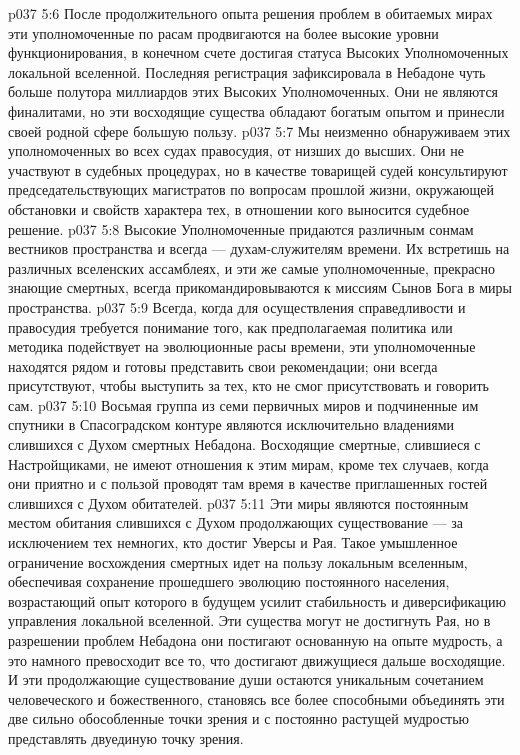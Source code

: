 \vs p037 5:6 После продолжительного опыта решения проблем в обитаемых мирах эти уполномоченные по расам продвигаются на более высокие уровни функционирования, в конечном счете достигая статуса Высоких Уполномоченных локальной вселенной. Последняя регистрация зафиксировала в Небадоне чуть больше полутора миллиардов этих Высоких Уполномоченных. Они не являются финалитами, но эти восходящие существа обладают богатым опытом и принесли своей родной сфере большую пользу.
\vs p037 5:7 Мы неизменно обнаруживаем этих уполномоченных во всех судах правосудия, от низших до высших. Они не участвуют в судебных процедурах, но в качестве товарищей судей консультируют председательствующих магистратов по вопросам прошлой жизни, окружающей обстановки и свойств характера тех, в отношении кого выносится судебное решение.
\vs p037 5:8 Высокие Уполномоченные придаются различным сонмам вестников пространства и всегда --- духам\hyp{}служителям времени. Их встретишь на различных вселенских ассамблеях, и эти же самые уполномоченные, прекрасно знающие смертных, всегда прикомандировываются к миссиям Сынов Бога в миры пространства.
\vs p037 5:9 Всегда, когда для осуществления справедливости и правосудия требуется понимание того, как предполагаемая политика или методика подействует на эволюционные расы времени, эти уполномоченные находятся рядом и готовы представить свои рекомендации; они всегда присутствуют, чтобы выступить за тех, кто не смог присутствовать и говорить сам.
\vs p037 5:10 \pc {} Восьмая группа из семи первичных миров и подчиненные им спутники в Спасоградском контуре являются исключительно владениями слившихся с Духом смертных Небадона. Восходящие смертные, слившиеся с Настройщиками, не имеют отношения к этим мирам, кроме тех случаев, когда они приятно и с пользой проводят там время в качестве приглашенных гостей слившихся с Духом обитателей.
\vs p037 5:11 Эти миры являются постоянным местом обитания слившихся с Духом продолжающих существование --- за исключением тех немногих, кто достиг Уверсы и Рая. Такое умышленное ограничение восхождения смертных идет на пользу локальным вселенным, обеспечивая сохранение прошедшего эволюцию постоянного населения, возрастающий опыт которого в будущем усилит стабильность и диверсификацию управления локальной вселенной. Эти существа могут не достигнуть Рая, но в разрешении проблем Небадона они постигают основанную на опыте мудрость, а это намного превосходит все то, что достигают движущиеся дальше восходящие. И эти продолжающие существование души остаются уникальным сочетанием человеческого и божественного, становясь все более способными объединять эти две сильно обособленные точки зрения и с постоянно растущей мудростью представлять двуединую точку зрения.
